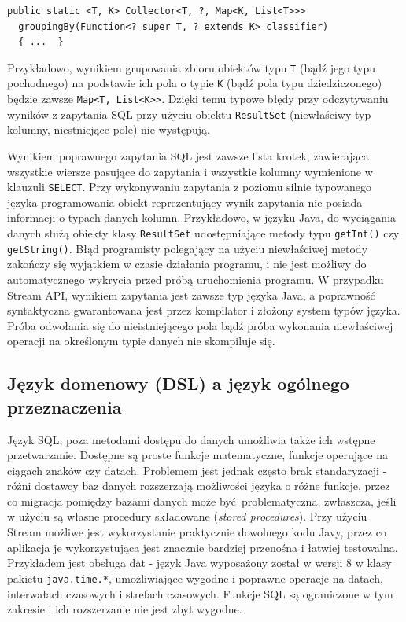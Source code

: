 \documentclass[12pt]{extarticle}
\begin{document}
\begin{lstlisting}[label=genericsexample, caption=Sygnatura metody grupującej]
  public static <T, K> Collector<T, ?, Map<K, List<T>>>
  groupingBy(Function<? super T, ? extends K> classifier) 
  { ...  }
\end{lstlisting}

    Przykładowo, wynikiem grupowania zbioru obiektów typu \texttt{T} (bądź jego typu pochodnego) na podstawie ich pola o typie \texttt{K} (bądź pola typu dziedziczonego) będzie zawsze \texttt{Map<T, List<K>}\texttt{>}. Dzięki temu typowe błędy przy odczytywaniu wyników z zapytania SQL przy użyciu obiektu \texttt{ResultSet} (niewłaściwy typ kolumny, niestniejące pole) nie występują.

    Wynikiem poprawnego zapytania SQL jest zawsze lista krotek, zawierająca wszystkie wiersze pasujące do zapytania i wszystkie kolumny wymienione w klauzuli \texttt{SELECT}. Przy wykonywaniu zapytania z poziomu silnie typowanego języka programowania obiekt reprezentujący wynik zapytania nie posiada informacji o typach danych kolumn. Przykładowo, w języku Java, do wyciągania danych służą obiekty klasy \texttt{ResultSet} udostępniające metody typu \texttt{getInt()} czy \texttt{getString()}. Błąd programisty polegający na użyciu niewłaściwej metody zakończy się wyjątkiem w czasie działania programu, i nie jest możliwy do automatycznego wykrycia przed próbą uruchomienia programu. W przypadku Stream API, wynikiem zapytania jest zawsze typ języka Java, a poprawność syntaktyczna gwarantowana jest przez kompilator i złożony system typów języka. Próba odwołania się do nieistniejącego pola bądź próba wykonania niewłaściwej operacji na określonym typie danych nie skompiluje się. 

\subsection{Język domenowy (DSL) a język ogólnego przeznaczenia}

    Język SQL, poza metodami dostępu do danych umożliwia także ich wstępne przetwarzanie. Dostępne są proste funkcje matematyczne, funkcje operujące na ciągach znaków czy datach. Problemem jest jednak często brak standaryzacji - różni dostawcy baz danych rozszerzają możliwości języka o różne funkcje, przez co migracja pomiędzy bazami danych może być problematyczna, zwłaszcza, jeśli w użyciu są własne procedury składowane (\textit{stored procedures}). Przy użyciu Stream możliwe jest wykorzystanie praktycznie dowolnego kodu Javy, przez co aplikacja je wykorzystująca jest znacznie bardziej przenośna i łatwiej testowalna. Przykładem jest obsługa dat - język Java wyposażony został w wersji 8 w klasy pakietu \texttt{java.time.*}, umożliwiające wygodne i poprawne operacje na datach, interwałach czasowych i strefach czasowych. Funkcje SQL są ograniczone w tym zakresie i ich rozszerzanie nie jest zbyt wygodne.
    
\end{document}
